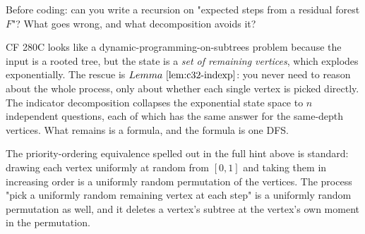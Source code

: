\begin{attemptgate}
Before coding: can you write a recursion on "expected steps from a residual
forest \(F\)"?  What goes wrong, and what decomposition avoids it?
\end{attemptgate}

CF 280C looks like a dynamic-programming-on-subtrees problem because the
input is a rooted tree, but the state is a \emph{set of remaining vertices},
which explodes exponentially.  The rescue is \(\lemref{c32-indexp}\): you
never need to reason about the whole process, only about whether each single
vertex is picked directly.  The indicator decomposition collapses the
exponential state space to \(n\) independent questions, each of which has
the same answer for the same-depth vertices.  What remains is a formula,
and the formula is one DFS.

The priority-ordering equivalence spelled out in the full hint above is standard: drawing
each vertex uniformly at random from \([0,1]\) and taking them in increasing
order is a uniformly random permutation of the vertices.  The process
"pick a uniformly random remaining vertex at each step" is a uniformly
random permutation as well, and it deletes a vertex's subtree at the
vertex's own moment in the permutation.

